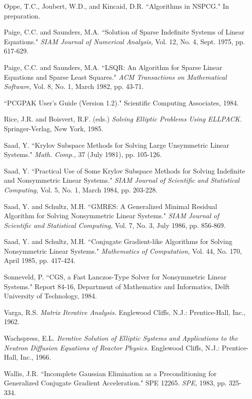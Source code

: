 \begin{thebibliography}{99}
 Oppe, T.C., Joubert, W.D., and Kincaid, D.R.
 ``Algorithms in NSPCG."  In preparation.

 Paige, C.C. and Saunders, M.A.  ``Solution
 of Sparse Indefinite Systems of Linear Equations."  {\em SIAM
 Journal of Numerical Analysis,} Vol. 12, No. 4, Sept. 1975,
 pp. 617-629.
 
 Paige, C.C. and Saunders, M.A. ``LSQR: An Algorithm
 for Sparse Linear Equations and Sparse Least Squares." {\em ACM
 Transactions on Mathematical Software,} Vol. 8, No. 1, March 1982,
 pp. 43-71.

 ``PCGPAK User's Guide (Version 1.2)."  Scientific 
 Computing Associates, 1984.
 
 Rice, J.R. and Boisvert, R.F. (eds.)
 {\em Solving Elliptic Problems Using ELLPACK.} Springer-Verlag,
 New York, 1985.
 
 Saad, Y. ``Krylov Subspace Methods for Solving
 Large Unsymmetric Linear Systems." {\em Math. Comp.,} 37 (July 1981),
 pp. 105-126.
 
 Saad, Y. ``Practical Use of Some Krylov Subspace
 Methods for Solving Indefinite and Nonsymmetric Linear Systems."
 {\em SIAM Journal of Scientific and Statistical Computing,} Vol. 5,
 No. 1, March 1984, pp. 203-228.
 
 Saad, Y. and Schultz, M.H. ``GMRES: A
 Generalized Minimal Residual Algorithm for Solving Nonsymmetric
 Linear Systems." {\em SIAM Journal of Scientific and Statistical
 Computing,} Vol. 7, No. 3, July 1986, pp. 856-869.
 
 Saad, Y. and Schultz, M.H. ``Conjugate
 Gradient-like Algorithms for Solving Nonsymmetric Linear
 Systems."  {\em Mathematics of Computation,} Vol. 44, No. 170,
 April 1985, pp. 417-424.

 Sonneveld, P. ``CGS, a Fast Lanczos-Type Solver
 for Nonsymmetric Linear Systems."  Report 84-16, Department of 
 Mathematics and Informatics, Delft University of Technology,
 1984.

 Varga, R.S.  {\em Matrix Iterative Analysis.}
 Englewood Cliffs, N.J.: Prentice-Hall, Inc., 1962.

 Wachspress, E.L. {\em Iterative Solution of Elliptic
 Systems and Applications to the Neutron Diffusion Equations
 of Reactor Physics.}  Englewood Cliffs, N.J.: Prentice-Hall, Inc.,
 1966.
 
 Wallis, J.R.  ``Incomplete Gaussian Elimination
 as a Preconditioning for Generalized Conjugate Gradient Acceleration."
 SPE 12265. {\em SPE,} 1983, pp. 325-334.
 

\end{thebibliography}
